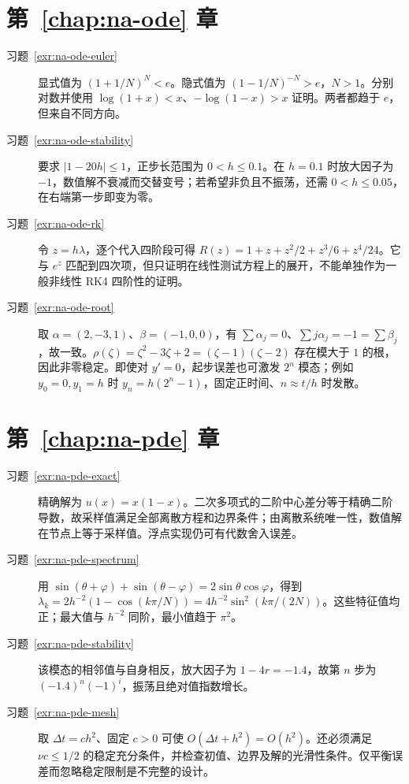 \section{第~\ref{chap:na-ode} 章}
\begin{description}
\item[习题~\ref{exr:na-ode-euler}] 显式值为 $(1+1/N)^N<e$。隐式值为 $(1-1/N)^{-N}>e$，$N>1$。分别对数并使用 $\log(1+x)<x$、$-\log(1-x)>x$ 证明。两者都趋于 $e$，但来自不同方向。
\item[习题~\ref{exr:na-ode-stability}] 要求 $|1-20h|\le1$，正步长范围为 $0<h\le0.1$。在 $h=0.1$ 时放大因子为 $-1$，数值解不衰减而交替变号；若希望非负且不振荡，还需 $0<h\le0.05$，在右端第一步即变为零。
\item[习题~\ref{exr:na-ode-rk}] 令 $z=h\lambda$，逐个代入四阶段可得 $R(z)=1+z+z^2/2+z^3/6+z^4/24$。它与 $e^z$ 匹配到四次项，但只证明在线性测试方程上的展开，不能单独作为一般非线性 RK4 四阶性的证明。
\item[习题~\ref{exr:na-ode-root}] 取 $\alpha=(2,-3,1)$、$\beta=(-1,0,0)$，有 $\sum\alpha_j=0$、$\sum j\alpha_j=-1=\sum\beta_j$，故一致。$\rho(\zeta)=\zeta^2-3\zeta+2=(\zeta-1)(\zeta-2)$ 存在模大于 $1$ 的根，因此非零稳定。即使对 $y'=0$，起步误差也可激发 $2^n$ 模态；例如 $y_0=0,y_1=h$ 时 $y_n=h(2^n-1)$，固定正时间、$n\approx t/h$ 时发散。
\end{description}

\section{第~\ref{chap:na-pde} 章}
\begin{description}
\item[习题~\ref{exr:na-pde-exact}] 精确解为 $u(x)=x(1-x)$。二次多项式的二阶中心差分等于精确二阶导数，故采样值满足全部离散方程和边界条件；由离散系统唯一性，数值解在节点上等于采样值。浮点实现仍可有代数舍入误差。
\item[习题~\ref{exr:na-pde-spectrum}] 用 $\sin(\theta+\varphi)+\sin(\theta-\varphi)=2\sin\theta\cos\varphi$，得到 $\lambda_k=2h^{-2}(1-\cos(k\pi/N))=4h^{-2}\sin^2(k\pi/(2N))$。这些特征值均正；最大值与 $h^{-2}$ 同阶，最小值趋于 $\pi^2$。
\item[习题~\ref{exr:na-pde-stability}] 该模态的相邻值与自身相反，放大因子为 $1-4r=-1.4$，故第 $n$ 步为 $(-1.4)^n(-1)^i$，振荡且绝对值指数增长。
\item[习题~\ref{exr:na-pde-mesh}] 取 $\Delta t=ch^2$、固定 $c>0$ 可使 $O(\Delta t+h^2)=O(h^2)$。还必须满足 $\nu c\le1/2$ 的稳定充分条件，并检查初值、边界及解的光滑性条件。仅平衡误差而忽略稳定限制是不完整的设计。
\end{description}

